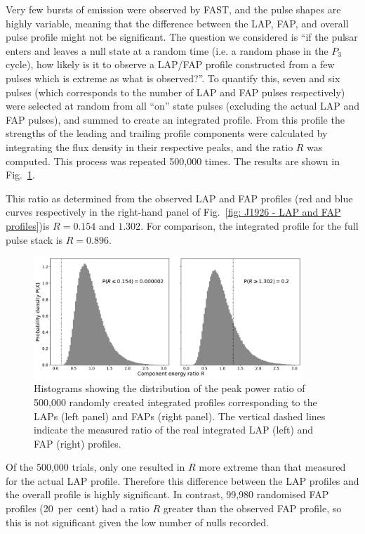 Very few bursts of emission were observed by FAST, and the pulse shapes are highly variable, meaning that the difference between the LAP, FAP, and overall pulse profile might not be significant. The question we considered is ``if the pulsar enters and leaves a null state at a random time (i.e. a random phase in the $P_3$ cycle), how likely is it to observe a LAP/FAP profile constructed from a few pulses which is extreme as what is observed?''.
To quantify this, seven and six pulses (which corresponds to the number of LAP and FAP pulses respectively) were selected at random from all ``on'' state pulses (excluding the actual LAP and FAP pulses), and summed to create an integrated profile. From this profile the strengths of the leading and trailing profile components were calculated by integrating the flux density in their respective peaks, and the ratio $R$ was computed. This process was repeated 500,000 times. The results are shown in Fig.~\ref{fig: J1926 - LAP and FAP histograms}.


This ratio as determined from the observed LAP and FAP profiles (red and blue curves respectively in the right-hand panel of Fig.~\ref{fig: J1926 - LAP and FAP profiles})is $R=0.154$ and $1.302$.  For comparison, the integrated profile for the full pulse stack is $R = 0.896$.
\begin{figure}
    \begin{center}
        \includegraphics[width=0.9\textwidth]{Figures/J1926/LAPFAP_histograms}
        \caption[Calculating the significance of the LAP and FAP profiles]{Histograms showing the distribution of the peak power ratio of 500,000 randomly created integrated profiles corresponding to the LAPs (left panel) and FAPs (right panel). The vertical dashed lines indicate the measured ratio of the real integrated LAP (left) and FAP (right) profiles.}
        \label{fig: J1926 - LAP and FAP histograms}
    \end{center}
\end{figure}
Of the 500,000 trials, only one resulted in $R$ more extreme than that measured for the actual LAP profile. Therefore this difference between the LAP profiles and the overall profile is highly significant. In contrast, 99,980 randomised FAP profiles (20~per~cent) had a ratio $R$ greater than the observed FAP profile, so this is not significant given the low number of nulls recorded.

